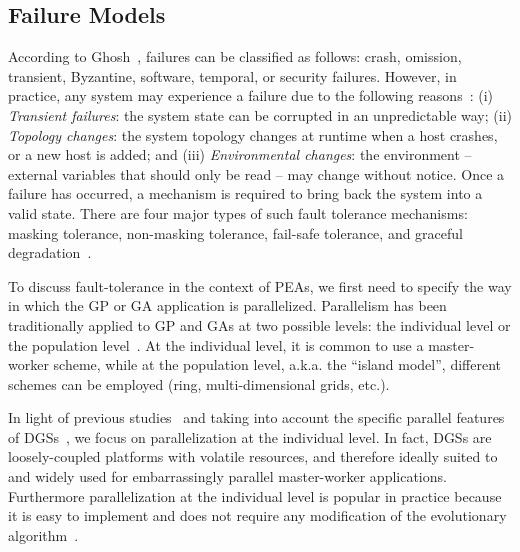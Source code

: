 \documentclass[graybox]{sty/svmult}
\begin{document}
\subsection{Failure Models}


According to Ghosh~\cite{distributed-systems}, failures can be classified
as follows: crash, omission, transient, Byzantine, software, temporal,
or security failures.
However, in practice, any system may experience a failure due to the following
reasons~\cite{distributed-systems}: (i) \emph{Transient failures}: the
system state can be corrupted in an unpredictable way; (ii) \emph{Topology
changes}: the system topology changes at runtime when a host crashes,
or a new host is added; and (iii) \emph{Environmental changes}: the
environment -- external variables that should only be read -- may change
without notice.  Once a failure has occurred, a mechanism
is required to bring back the system into a valid state. There
are four major types of such fault tolerance mechanisms: masking tolerance,
non-masking tolerance, fail-safe tolerance, and graceful
degradation~\cite{distributed-systems}.

To discuss fault-tolerance in the context of PEAs, we
first need to specify the way in which the GP or GA application is
parallelized.  Parallelism has been traditionally applied to
GP and GAs at two possible levels: the individual level or the population
level~\cite{spatially-structured-EAs,parallel-ga-survey,modelo-islas2,parallel-eas}.
At the individual level, it is common to use a master-worker scheme,
while at the population level, a.k.a. the ``island model'', different
schemes can be employed (ring, multi-dimensional grids, etc.).

In light of previous studies~\cite{spatially-structured-EAs,modelo-islas2}
and taking into account the specific parallel features
of DGSs~\cite{dgc-caracteristicas,traces-dgc}, we focus on
parallelization at the individual level. In fact, DGSs are
loosely-coupled platforms with volatile resources, and therefore
ideally suited to and widely used for embarrassingly parallel
master-worker applications. Furthermore parallelization at the
individual level is popular in practice because it is easy to
implement and does not require any modification of the evolutionary
algorithm~\cite{parallel-ga-survey,modelo-islas2,parallel-eas}.
\end{document}

